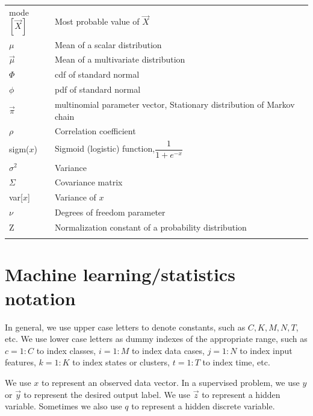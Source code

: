 \documentclass[a4paper,11pt]{article}
\begin{document}
\begin{longtable}{ll}
	mode$[\vec X]$ & Most probable value of $\vec X$\\
	$\mu$ & Mean of a scalar distribution\\
	$\vec{\mu}$ & Mean of a multivariate distribution\\
	$\Phi$ & cdf of standard normal\\
	$\phi$ & pdf of standard normal\\
	$\vec{\pi}$ & multinomial parameter vector, Stationary distribution of Markov chain\\
	$\rho$ & Correlation coefficient \\
	sigm($x$) & Sigmoid (logistic) function,$\dfrac{1}{1+e^{-x}}$\\
	$\sigma^2$ & Variance\\
	$\Sigma$ & Covariance matrix\\
	var[$x$] & Variance of $x$\\
	$\nu$ & Degrees of freedom parameter\\
	Z & Normalization constant of a probability distribution\\
	\noalign{\smallskip}\hline\noalign{\smallskip}
\end{longtable}


\section*{Machine learning/statistics notation}
In general, we use upper case letters to denote constants, such as $C, K, M, N, T$, etc. We use lower case letters as dummy indexes of the appropriate range, such as $c=1:C$ to index classes, $i=1:M$ to index data cases, $j=1:N$ to index input features, $k=1:K$ to index states or clusters, $t=1:T$ to index time, etc.

We use $x$ to represent an observed data vector. In a supervised problem, we use $y$ or $\vec{y}$ to represent the desired output label. We use $\vec{z}$ to represent a hidden variable. Sometimes we also use $q$ to represent a hidden discrete variable.
\end{document}
